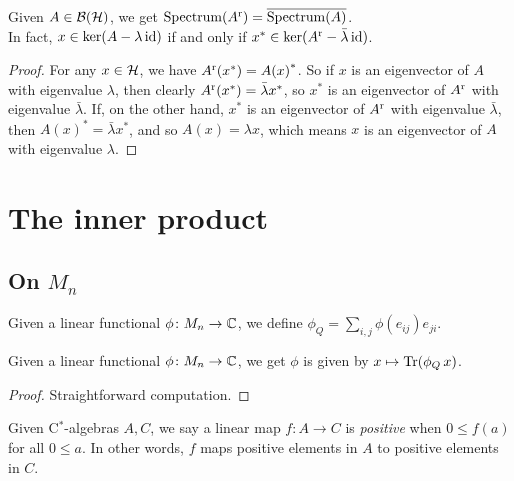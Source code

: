  \begin{proposition}\label{LinearMap.real.spectrum}
  \leanok
  Given $A\in\mathcal{B}(\mathcal{H})$, we get $\operatorname{Spectrum}({A}^{\operatorname{r}})=\overline{\operatorname{Spectrum}(A)}$.\\
  In fact, $x\in\ker(A-\lambda\operatorname{id})$ if and only if $x^*\in\ker({A}^{\operatorname{r}}-\bar{\lambda}\operatorname{id})$.
 \end{proposition}
 \begin{proof}\leanok
  For any $x\in\mathcal{H}$, we have ${A}^{\operatorname{r}}(x^*)={A(x)}^*$. So if $x$ is an eigenvector of $A$ with eigenvalue $\lambda$, then clearly ${A}^{\operatorname{r}}(x^*)=\bar{\lambda}x^*$, so $x^*$ is an eigenvector of ${A}^{\operatorname{r}}$ with eigenvalue $\bar{\lambda}$.
  If, on the other hand, $x^*$ is an eigenvector of ${A}^{\operatorname{r}}$ with eigenvalue $\bar{\lambda}$, then ${A(x)}^*=\bar{\lambda}x^*$, and so $A(x)=\lambda x$, which means $x$ is an eigenvector of $A$ with eigenvalue $\lambda$.
 \end{proof}

\chapter{The inner product}

 \section{On $M_n$}

  \begin{definition}\label{Dual.matrix}\leanok
   Given a linear functional $\phi\colon M_n \to \mathbb{C}$, we define $\phi_Q=\sum_{i,j}\phi(e_{ij})e_{ji}$.
  \end{definition}

  \begin{lemma}\label{dual_eq_trace}\leanok
   Given a linear functional $\phi\colon M_n\to\mathbb{C}$, we get $\phi$ is given by $x\mapsto\operatorname{Tr}(\phi_Q \,x)$.
  \end{lemma}
  \begin{proof}\leanok
   Straightforward computation.
  \end{proof}

  \begin{definition}\label{LinearMap.IsPosMap}\leanok
   Given C$^*$-algebras $A,C$, we say a linear map $f\colon A \to C$ is \textit{positive} when $0\leq f(a)$ for all $0\leq a$. In other words, $f$ maps positive elements in $A$ to positive elements in $C$.
  \end{definition}


